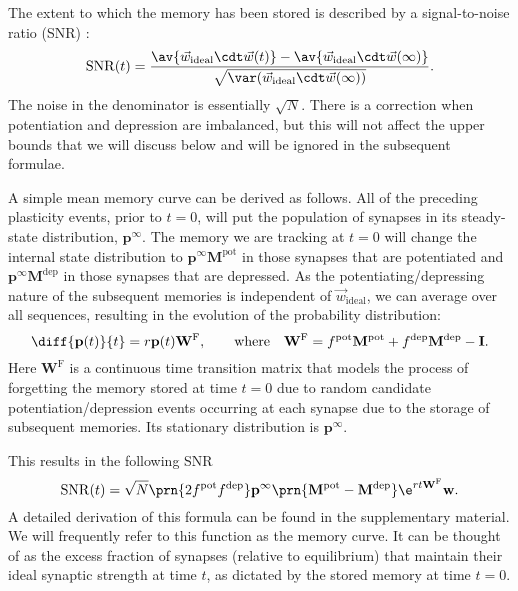 \documentclass{article} %
\DeclareMathOperator{\snr}{SNR}
\newcommand{\wv}{\vec{w}}
\newcommand{\wvi}{\vec{w}_\text{ideal}}
\newcommand{\I}{\mathbf{I}}
\newcommand{\pr}{\mathbf{p}}
\newcommand{\eq}{\pr^\infty}
\newcommand{\w}{\mathbf{w}}
\newcommand{\W}{\mathbf{W}}
\newcommand{\M}{\mathbf{M}}
\newcommand{\frg}{\W^{\mathrm{F}}}
\newcommand{\pot}{^{\text{pot}}}
\newcommand{\dep}{^{\text{dep}}}
\begin{document}
The extent to which the memory has been stored is described by a signal-to-noise ratio (SNR) \cite{Fusi2005cascade,Fusi2007multistate}:
%
\begin{equation}\label{eq:SNRdef}
  \snr(t) = \frac{\av{\wv_\text{ideal}\cdt\wv(t)} - \av{\wv_\text{ideal}\cdt\wv(\infty)}}
     {\sqrt{\var(\wv_\text{ideal}\cdt\wv(\infty))}}.
\end{equation}
%
The noise in the denominator is essentially $\sqrt{N}$.
There is a correction when potentiation and depression are imbalanced, but this will not affect the upper bounds that we will discuss below and will be ignored in the subsequent formulae.

A simple mean memory curve can be derived as follows.
All of the preceding plasticity events, prior to $t=0$, will put the population of synapses in its steady-state distribution, $\eq$.
The memory we are tracking at $t=0$ will change the internal state distribution to $\eq\M\pot$ in those synapses that are potentiated and $\eq\M\dep$ in those synapses that are depressed.
As the potentiating/depressing nature of the subsequent memories is independent of $\wvi$, we can average over all sequences, resulting in the evolution of the probability distribution:
%
\begin{equation}\label{eq:evol}
  \diff{\pr(t)}{t} = r\pr(t)\frg,
  \qquad \text{where} \quad
  \frg = f\pot\M\pot + f\dep\M\dep - \I.
\end{equation}
%
Here $\frg$ is a continuous time transition matrix that models the process of forgetting the memory stored at time $t=0$ due to random candidate potentiation/depression events occurring at each synapse due to the storage of subsequent memories.
Its stationary distribution is $\eq$.


This results in the following SNR
%
\begin{equation}\label{eq:SNRcalc}
  \snr(t) = \sqrt{N}\prn{2 f\pot f\dep} \eq \prn{\M\pot-\M\dep} \e^{rt\frg} \w.
\end{equation}
%
A detailed derivation of this formula can be found in the supplementary material.
We will frequently refer to this function as the memory curve.
It can be thought of as the excess fraction of synapses (relative to equilibrium) that maintain their ideal synaptic strength at time $t$, as dictated by the stored memory at time $t=0$.
\end{document}
